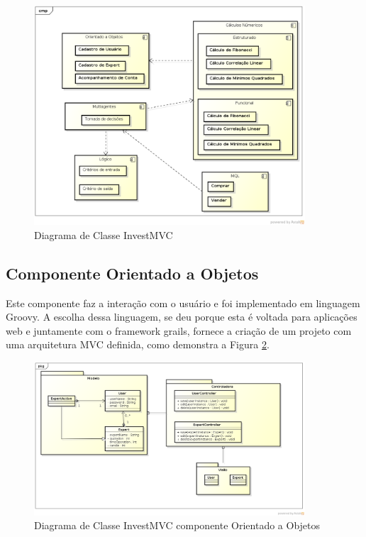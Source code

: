 \begin{figure}[H]
\centering
\includegraphics[width=0.9\textwidth]{figuras/componente}
\caption{Diagrama de Classe InvestMVC}
\label{componente}
\end{figure}

\subsection{Componente Orientado a Objetos}

Este componente faz a interação com o usuário e foi implementado em linguagem Groovy. A escolha dessa linguagem, se deu porque esta é voltada para aplicações web e juntamente com  o framework grails, fornece a criação de um projeto com uma arquitetura MVC definida, como demonstra a Figura \ref{classeOO}.

\begin{figure}[H]
\centering
\includegraphics[width=0.9\textwidth]{figuras/classeOO}
\caption{Diagrama de Classe InvestMVC componente Orientado a Objetos} 
\label{classeOO}
\end{figure}

